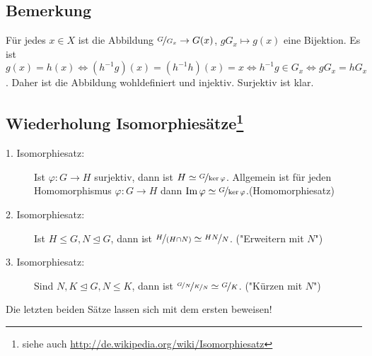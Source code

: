 \subsection[Bemerkung über eine Abbildung $\nicefrac{G}{G_x} \to G(x)$]{Bemerkung} %
\label{sub:12}
Für jedes $x \in X$ ist die Abbildung $\nicefrac{G}{G_x} \to G(x)$, $g G_x \mapsto g(x)$ eine Bijektion.
Es ist $g(x) = h(x) \iff (h ^{-1} g)(x)=(h^{-1}h)(x)=x \iff h ^{-1} g \in G_x \iff g G_x = h G_x$. Daher ist die Abbildung wohldefiniert und injektiv. Surjektiv ist klar. \bewende

\subsection*{Wiederholung Isomorphiesätze\footnote{siehe auch \url{http://de.wikipedia.org/wiki/Isomorphiesatz}}} %
\label{sub:wiederholung_isomorphiesätze}
\begin{description}
	\item[1. Isomorphiesatz:] Ist $\varphi : G \to H$ surjektiv, dann ist $H \simeq \nicefrac{G}{\ker \varphi}$. Allgemein ist für jeden Homomorphismus $\varphi : G \to H$
	dann $\operatorname{Im} \varphi \simeq \nicefrac{G}{\ker \varphi}$.\hfill {\color{lightgray}(Homomorphiesatz)}
	\item[2. Isomorphiesatz:] Ist $H \le G, N \unlhd G$, dann ist $\nicefrac{H}{(H \cap N)} \simeq \nicefrac{H N}{N}$.\hfill {\color{lightgray} ("{}Erweitern mit $N$")}
	\item[3. Isomorphiesatz:] Sind $N,K \unlhd G, N \le K$, dann ist $\nicefrac{\nicefrac{G}{N}}{\nicefrac{K}{N}} \simeq \nicefrac{G}{K}$. \hfill
	{\color{lightgray} ("{}Kürzen mit $N$")}
\end{description}
Die letzten beiden Sätze lassen sich mit dem ersten beweisen!


